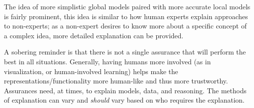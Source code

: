 The idea of more simplistic global models paired with more accurate local models is fairly prominent, this idea is similar to how human experts explain approaches to non-experts; as a non-expert desires to know more about a specific concept of a complex idea, more detailed explanation can be provided.

A sobering reminder is that there is not a single assurance that will perform the best in all situations. Generally, having humans more involved (as in visualization, or human-involved learning) helps make the representations/functionality more human-like and thus more trustworthy. Assurances need, at times, to explain models, data, and reasoning. The methods of explanation can vary and \emph{should} vary based on who requires the explanation.
